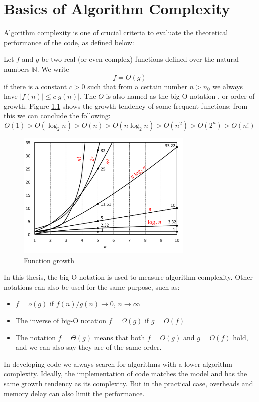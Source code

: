 
\chapter{Basics of Algorithm Complexity\label{chpt:computing-performance}}

Algorithm complexity is one of crucial criteria to evaluate the theoretical
performance of the code, as defined below:

Let $f$ and $g$ be two real (or even complex) functions defined
over the natural numbers $\mathbb{N}$. We write
\begin{equation}
f=O(g)
\end{equation}
if there is a constant $c>0$ such that from a certain number $n>n_{0}$
we always have $\left|f(n)\right|\leq c\left|g(n)\right|$. The $O$
is also named as the big-O notation \citep{Complexity}, or order
of growth. Figure \ref{fig:order-of-growth} shows the growth tendency
of some frequent functions; from this we can conclude the following:
\begin{equation}
O(1)>O(\log_{2}n)>O(n)>O(n\log_{2}n)>O(n^{2})>O(2^{n})>O(n!)
\end{equation}

\begin{figure}[h]
\begin{centering}
\includegraphics[width=0.75\textwidth]{_figure/orders-of-growth}
\par\end{centering}
\caption{Function growth\label{fig:order-of-growth}}
\end{figure}

In this thesis, the big-O notation is used to measure algorithm complexity.
Other notations can also be used for the same purpose, such as:
\begin{itemize}
\item $f=o(g)$ if $f(n)/g(n)\rightarrow0$, $n\rightarrow\infty$
\item The inverse of big-O notation $f=\Omega(g)$ if $g=O(f)$
\item The notation $f=\Theta(g)$ means that both $f=O(g)$ and $g=O(f)$
hold, and we can also say they are of the same order.
\end{itemize}
In developing code we always search for algorithms with a lower algorithm
complexity. Ideally, the implementation of code matches the model
and has the same growth tendency as its complexity. But in the practical
case, overheads and memory delay can also limit the performance.

